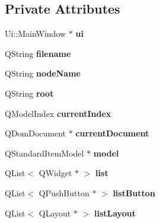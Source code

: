 \subsection*{Private Attributes}
\begin{DoxyCompactItemize}
\item 
\hypertarget{classMainWindow_a35466a70ed47252a0191168126a352a5}{Ui\-::\-Main\-Window $\ast$ {\bfseries ui}}\label{classMainWindow_a35466a70ed47252a0191168126a352a5}

\item 
\hypertarget{classMainWindow_a53fd1e1d3acbd985e622f97003c20e4e}{Q\-String {\bfseries filename}}\label{classMainWindow_a53fd1e1d3acbd985e622f97003c20e4e}

\item 
\hypertarget{classMainWindow_ab95d2b324604f48a9b4599a0d69c135a}{Q\-String {\bfseries node\-Name}}\label{classMainWindow_ab95d2b324604f48a9b4599a0d69c135a}

\item 
\hypertarget{classMainWindow_a03a6f597bea79dd8e2dd74f3d0195f48}{Q\-String {\bfseries root}}\label{classMainWindow_a03a6f597bea79dd8e2dd74f3d0195f48}

\item 
\hypertarget{classMainWindow_ab41d081fd36048cdc7f0f7b6d9af4855}{Q\-Model\-Index {\bfseries current\-Index}}\label{classMainWindow_ab41d081fd36048cdc7f0f7b6d9af4855}

\item 
\hypertarget{classMainWindow_acf359550b2cb8095eaa5a3a87fa7f9f3}{Q\-Dom\-Document $\ast$ {\bfseries current\-Document}}\label{classMainWindow_acf359550b2cb8095eaa5a3a87fa7f9f3}

\item 
\hypertarget{classMainWindow_aa1a1f8ce9c37a7ac70d21402759638b3}{Q\-Standard\-Item\-Model $\ast$ {\bfseries model}}\label{classMainWindow_aa1a1f8ce9c37a7ac70d21402759638b3}

\item 
\hypertarget{classMainWindow_a47316d915f71d763479d846c24d79268}{Q\-List$<$ Q\-Widget $\ast$ $>$ {\bfseries list}}\label{classMainWindow_a47316d915f71d763479d846c24d79268}

\item 
\hypertarget{classMainWindow_ad0a212146dfe4452f07c574773e9082c}{Q\-List$<$ Q\-Push\-Button $\ast$ $>$ {\bfseries list\-Button}}\label{classMainWindow_ad0a212146dfe4452f07c574773e9082c}

\item 
\hypertarget{classMainWindow_a91f8d3559167d4b4cb30d3956dbd1eac}{Q\-List$<$ Q\-Layout $\ast$ $>$ {\bfseries list\-Layout}}\label{classMainWindow_a91f8d3559167d4b4cb30d3956dbd1eac}


\end{DoxyCompactItemize}
